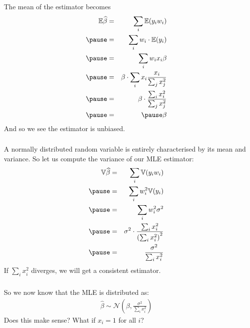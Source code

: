 \begin{frame}[fragile] \frametitle{}

The mean of the estimator becomes
\begin{eqnarray*}
\mathbb{E} \widehat{\beta} &=& \sum_i \mathbb{E} (y_i w_i) \\ \pause
&=& \sum_i w_i \cdot \mathbb{E} (y_i) \\ \pause
&=& \sum_i w_i x_i \beta \\ \pause
&=& \beta \cdot \sum_i x_i \frac{x_i}{\sum_j x_j^2} \\ \pause
&=& \beta \cdot \frac{\sum_i x_i^2}{\sum_j x_j^2} \\ \pause
&=& \pause \beta
\end{eqnarray*}
And so we see the estimator is unbiased.

\end{frame}

\begin{frame}[fragile] \frametitle{}

A normally distributed random variable is entirely characterised
by its mean and variance. So let us compute the variance of our
MLE estimator:
\begin{eqnarray*}
\mathbb{V} \widehat{\beta} &=& \sum_i \mathbb{V} (y_i w_i) \\ \pause
&=& \sum_i w_i^2 \mathbb{V} (y_i) \\ \pause
&=& \sum_i w_i^2 \sigma^2 \\ \pause
&=& \sigma^2 \cdot \frac{\sum_i x_i^2}{\left(\sum_i x_i^2\right)^2}   \\ \pause
&=& \frac{\sigma^2}{\sum_i x_i^2}
\end{eqnarray*}
If $\sum_i x_i^2$ diverges, we will get a consistent estimator.

\end{frame}

\begin{frame}[fragile] \frametitle{}

So we now know that the MLE is distributed as:
\begin{align*}
\widehat{\beta} \sim \mathcal{N} (\beta, \frac{\sigma^2}{\sum_i x_i^2})
\end{align*}
\pause Does this make sense? What if $x_i = 1$ for
all $i$?

\end{frame}


